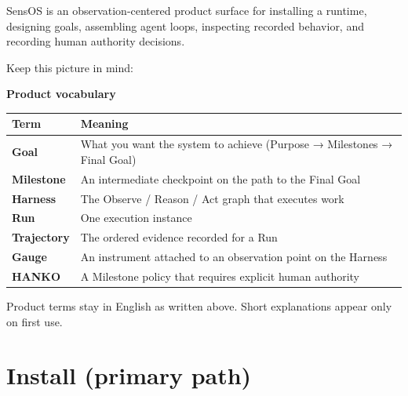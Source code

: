 \documentclass[11pt,a4paper,oneside]{article}
\begin{document}
SensOS is an observation-centered product surface for installing a runtime, designing goals, assembling agent loops, inspecting recorded behavior, and recording human authority decisions.

Keep this picture in mind:

\begin{center}
\end{center}

\vspace{0.6em}
\noindent\textbf{Product vocabulary}

\begin{center}
\begin{tabularx}{\textwidth}{@{}>{\bfseries}Y L@{}}
\toprule
Term & Meaning \\
\midrule
Goal & What you want the system to achieve (Purpose → Milestones → Final Goal) \\
Milestone & An intermediate checkpoint on the path to the Final Goal \\
Harness & The Observe / Reason / Act graph that executes work \\
Run & One execution instance \\
Trajectory & The ordered evidence recorded for a Run \\
Gauge & An instrument attached to an observation point on the Harness \\
HANKO & A Milestone policy that requires explicit human authority \\
\bottomrule
\end{tabularx}
\end{center}

Product terms stay in English as written above. Short explanations appear only on first use.

\section{Install (primary path)}
\label{sec:install}
\end{document}
